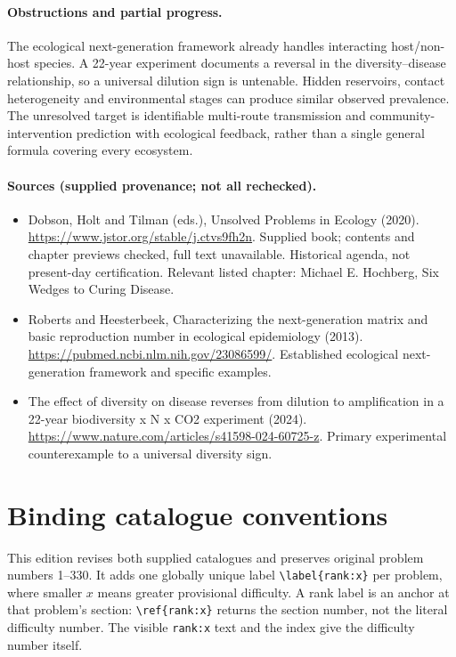 \documentclass[11pt]{article}
\begin{document}
\paragraph{Obstructions and partial progress.} The ecological next-generation framework already handles interacting host/non-host species. A 22-year experiment documents a reversal in the diversity--disease relationship, so a universal dilution sign is untenable. Hidden reservoirs, contact heterogeneity and environmental stages can produce similar observed prevalence. The unresolved target is identifiable multi-route transmission and community-intervention prediction with ecological feedback, rather than a single general formula covering every ecosystem.
\paragraph{Sources (supplied provenance; not all rechecked).}
\begin{itemize}
\item Dobson, Holt and Tilman (eds.), Unsolved Problems in Ecology (2020). \url{https://www.jstor.org/stable/j.ctvs9fh2n}. Supplied book; contents and chapter previews checked, full text unavailable. Historical agenda, not present-day certification. Relevant listed chapter: Michael E. Hochberg, Six Wedges to Curing Disease.
\item Roberts and Heesterbeek, Characterizing the next-generation matrix and basic reproduction number in ecological epidemiology (2013). \url{https://pubmed.ncbi.nlm.nih.gov/23086599/}. Established ecological next-generation framework and specific examples.
\item The effect of diversity on disease reverses from dilution to amplification in a 22-year biodiversity x N x CO2 experiment (2024). \url{https://www.nature.com/articles/s41598-024-60725-z}. Primary experimental counterexample to a universal diversity sign.
\end{itemize}


\section*{Binding catalogue conventions}
This edition revises both supplied catalogues and preserves original problem numbers 1--330. It adds one globally unique label \verb|\label{rank:x}| per problem, where smaller $x$ means greater provisional difficulty. A rank label is an anchor at that problem's section: \verb|\ref{rank:x}| returns the section number, not the literal difficulty number. The visible \texttt{rank:x} text and the index give the difficulty number itself.
\end{document}
